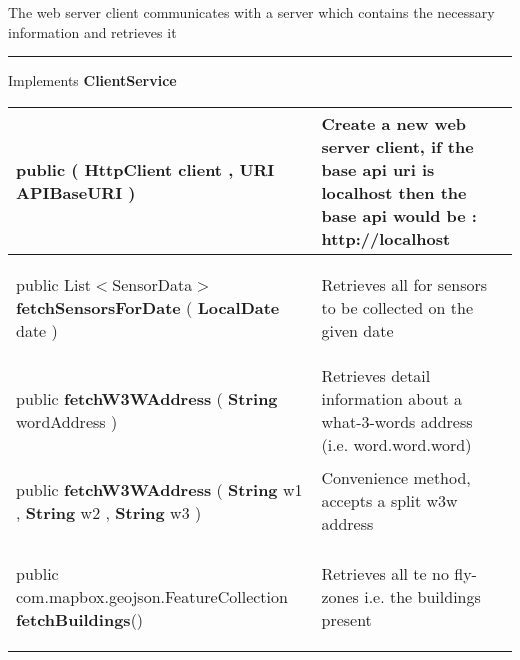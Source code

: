  {\scriptsize The web server client communicates with a server which contains the necessary information and retrieves it
 
\vspace*{4pt} \hrule \vspace*{3pt}
Implements \textbf{ ClientService }
\vspace*{-5pt} 
\begin{tabularx}{\linewidth}{m{}|m{}}
\label{tab:AQWebServerClient}
\begin{raggedleft}public  \textbf{\hyperref[tab:AQWebServerClient]{\color{blue}{AQWebServerClient}} }(\newline \hfill 
\hspace*{ 5pt} \textbf{HttpClient} client , \newline
 \hspace*{ 5pt} \textbf{URI} APIBaseURI  )
\end{raggedleft} &
 Create a new web server client, if the base api uri is localhost then the base api would be : http://localhost\\ \hline 
\begin{raggedleft}public List$<$SensorData$>$ \textbf{fetchSensorsForDate }(\hspace*{ 5pt} \textbf{LocalDate} date  )
\end{raggedleft} &
 Retrieves all \hyperref[tab:SensorData]{\color{blue}{SensorData}} for sensors to be collected on the given date\\ \hline 
\begin{raggedleft}public \hyperref[tab:W3WAddressData]{\color{blue}{W3WAddressData}} \textbf{fetchW3WAddress }(\hspace*{ 5pt} \textbf{String} wordAddress  )
\end{raggedleft} &
 Retrieves detail information about a what{-}3{-}words address (i.e. word.word.word)\\ \hline 
\begin{raggedleft}public \hyperref[tab:W3WAddressData]{\color{blue}{W3WAddressData}} \textbf{fetchW3WAddress }(\newline \hfill 
\hspace*{ 5pt} \textbf{String} w1 , \newline
 \hspace*{ 5pt} \textbf{String} w2 , \newline
 \hspace*{ 5pt} \textbf{String} w3  )
\end{raggedleft} &
 Convenience method, accepts a split w3w address\\ \hline 
\begin{raggedleft}public com.mapbox.geojson.FeatureCollection \textbf{fetchBuildings}()
\end{raggedleft} &
 Retrieves all te no fly{-}zones i.e. the buildings present\\\end{tabularx}
}
